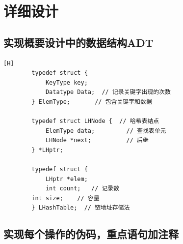 \documentclass[a4paper]{article}
\begin{document}
	\section{详细设计}\label{sec:design2}

	\subsection{实现概要设计中的数据结构ADT}\label{subsec:adt2}
	\begin{lstlisting}[caption={},label={lst:lstlisting}][H]
        typedef struct {
            KeyType key;
            Datatype Data;  // 记录关键字出现的次数
        } ElemType;       // 包含关键字和数据

        typedef struct LHNode {  // 哈希表结点
            ElemType data;         // 查找表单元
            LHNode *next;          // 后继
        } *LHptr;

        typedef struct {
            LHptr *elem;
            int count;   // 记录数
        int size;    // 容量
        } LHashTable;  // 链地址存储法
	\end{lstlisting}

	\subsection{实现每个操作的伪码，重点语句加注释}\label{subsec:explain}
\end{document}
